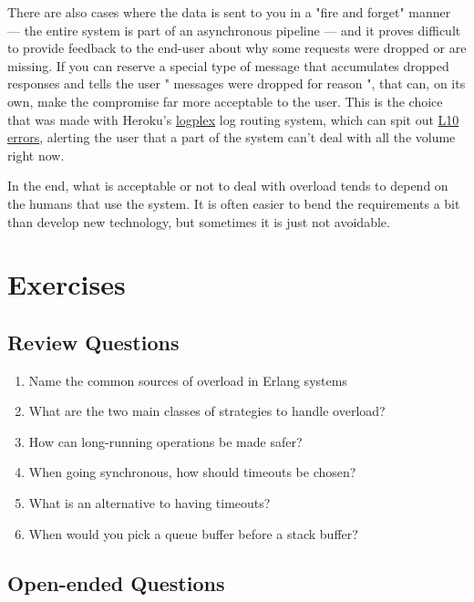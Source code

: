 \documentclass[11pt, oneside]{book}   	%
\begin{document}
There are also cases where the data is sent to you in a "fire and forget" manner — the entire system is part of an asynchronous pipeline — and it proves difficult to provide feedback to the end-user about why some requests were dropped or are missing. If you can reserve a special type of message that accumulates dropped responses and tells the user " messages were dropped for reason ", that can, on its own, make the compromise far more acceptable to the user. This is the choice that was made with Heroku's \href{https://devcenter.heroku.com/articles/logplex}{logplex} log routing system, which can spit out \href{https://devcenter.heroku.com/articles/error-codes\#l10-drain-buffer-overflow}{L10 errors}, alerting the user that a part of the system can't deal with all the volume right now.

In the end, what is acceptable or not to deal with overload tends to depend on the humans that use the system. It is often easier to bend the requirements a bit than develop new technology, but sometimes it is just not avoidable.


\section{Exercises}

\subsection*{Review Questions}

\begin{enumerate}
	\item Name the common sources of overload in Erlang systems
	\item What are the two main classes of strategies to handle overload?
	\item How can long-running operations be made safer?
	\item When going synchronous, how should timeouts be chosen?
	\item What is an alternative to having timeouts?
	\item When would you pick a queue buffer before a stack buffer?
\end{enumerate}

\subsection*{Open-ended Questions}
\end{document}
